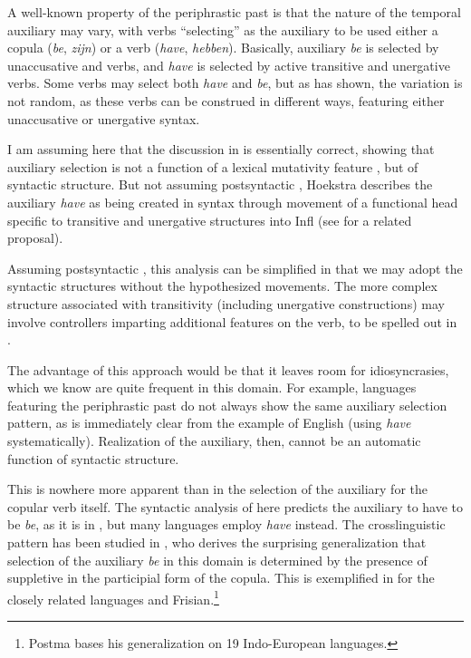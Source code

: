 \documentclass[output=paper]{LSP/langsci}
\begin{document}
A well-known property of the periphrastic past is that the nature of the temporal auxiliary may vary, with verbs ``selecting'' as the auxiliary to be used either a copula (\textit{be},  \textit{zijn}) or a  verb (\textit{have},  \textit{hebben}). Basically, auxiliary \textit{be} is selected by unaccusative and  verbs, and \textit{have }is selected by active transitive and unergative verbs. Some verbs may select both \textit{have} and \textit{be}, but as \citet{Hoekstra1984} has shown, the variation is not random, as these verbs can be construed in different ways, featuring either unaccusative or unergative syntax.

  I am assuming here that the discussion in \citet{Hoekstra1999} is essentially correct, showing that auxiliary selection is not a function of a lexical mutativity feature \citep{Kern1912}, but of syntactic structure. But not assuming postsyntactic , Hoekstra describes the auxiliary \textit{have} as being created in syntax through movement of a functional head specific to transitive and unergative structures into Infl (see \citealt{Kayne1993} for a related proposal). 

  Assuming postsyntactic , this analysis can be simplified in that we may adopt the syntactic structures without the hypothesized movements. The more complex structure associated with transitivity (including unergative constructions) may involve controllers imparting additional features on the verb, to be spelled out in .

  The advantage of this approach would be that it leaves room for  idiosyncrasies, which we know are quite frequent in this domain. For example, languages featuring the periphrastic past do not always show the same auxiliary selection pattern, as is immediately clear from the example of English (using \textit{have} systematically). Realization of the auxiliary, then, cannot be an automatic function of syntactic structure.

  This is nowhere more apparent than in the selection of the auxiliary for the copular verb itself. The syntactic analysis of \citet{Hoekstra1999} here predicts the auxiliary to have to be \textit{be}, as it is in , but many languages employ \textit{have} instead. The crosslinguistic pattern has been studied in \citet{Postma1993}, who derives the surprising generalization that selection of the auxiliary \textit{be} in this domain is determined by the presence of suppletive  in the participial form of the copula. This is exemplified in  for the closely related languages  and Frisian.\footnote{Postma bases his generalization on 19 Indo-European languages.}
\end{document}
